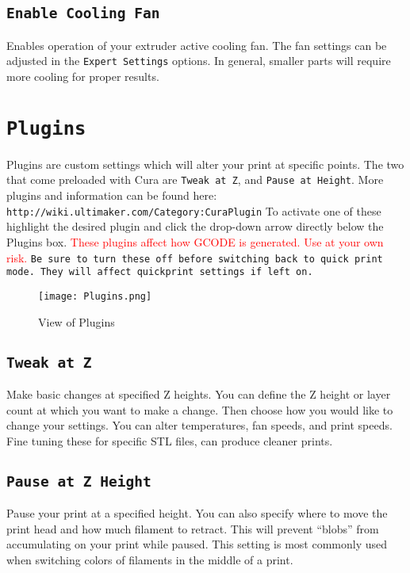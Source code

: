 \subsection{\texttt{Enable Cooling Fan}}
Enables operation of your extruder active cooling fan. The fan settings can be adjusted in the \texttt{Expert Settings} options. In general, smaller parts will require more cooling for proper results. 

\section{\texttt{Plugins}}
Plugins are custom settings which will alter your print at specific points. The two that come preloaded with Cura are \texttt{Tweak at Z}, and \texttt{Pause at Height}. More plugins and information can be found here: \texttt{http://wiki.ultimaker.com/Category:CuraPlugin} To activate one of these highlight the desired plugin and click the drop-down arrow directly below the Plugins box. \textcolor{red}{These plugins affect how GCODE is generated. Use at your own risk.} \texttt{Be sure to turn these off before switching back to quick print mode. They will affect quickprint settings if left on.}
\begin{figure}[H]
\centering
\texttt{[image: Plugins.png]}
\caption{View of Plugins}
\label{fig:Plugins}
\end{figure}

\subsection{\texttt{Tweak at Z}}
Make basic changes at specified Z heights. You can define the Z height or layer count at which you want to make a change. Then choose how you would like to change your settings. You can alter temperatures, fan speeds, and print speeds. Fine tuning these for specific STL files, can produce cleaner prints.

\subsection{\texttt{Pause at Z Height}}
Pause your print at a specified height. You can also specify where to move the print head and how much filament to retract. This will prevent “blobs” from accumulating on your print while paused. This setting is most commonly used when switching colors of filaments in the middle of a print.

